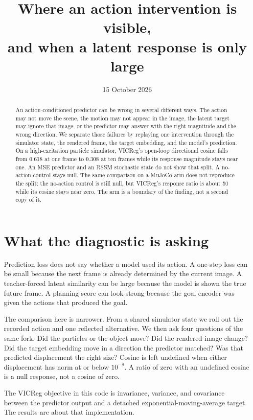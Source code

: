 \documentclass{article}
\title{Where an action intervention is visible,\\
and when a latent response is only large}
\author{}
\date{15 October 2026}
\begin{document}
\maketitle

\begin{abstract}
An action-conditioned predictor can be wrong in several different ways. The action may not move the scene, the motion may not appear in the image, the latent target may ignore that image, or the predictor may answer with the right magnitude and the wrong direction. We separate those failures by replaying one intervention through the simulator state, the rendered frame, the target embedding, and the model's prediction. On a high-excitation particle simulator, VICReg's open-loop directional cosine falls from 0.618 at one frame to 0.308 at ten frames while its response magnitude stays near one. An MSE predictor and an RSSM stochastic state do not show that split. A no-action control stays null. The same comparison on a MuJoCo arm does not reproduce the split: the no-action control is still null, but VICReg's response ratio is about 50 while its cosine stays near zero. The arm is a boundary of the finding, not a second copy of it.
\end{abstract}

\section{What the diagnostic is asking}

Prediction loss does not say whether a model used its action. A one-step loss can be small because the next frame is already determined by the current image. A teacher-forced latent similarity can be large because the model is shown the true future frame. A planning score can look strong because the goal encoder was given the actions that produced the goal.

The comparison here is narrower. From a shared simulator state we roll out the recorded action and one reflected alternative. We then ask four questions of the same fork. Did the particles or the object move? Did the rendered image change? Did the target embedding move in a direction the predictor matched? Was that predicted displacement the right size? Cosine is left undefined when either displacement has norm at or below \(10^{-8}\). A ratio of zero with an undefined cosine is a null response, not a cosine of zero.

The VICReg objective in this code is invariance, variance, and covariance between the predictor output and a detached exponential-moving-average target. The results are about that implementation.
\end{document}
